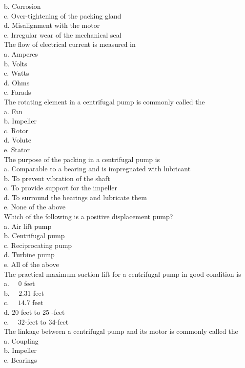 b. Corrosion\\
c. Over-tightening of the packing gland\\
d. Misalignment with the motor\\
e. Irregular wear of the mechanical seal\\
The flow of electrical current is measured in\\
a. Amperes\\
b. Volts\\
c. Watts\\
d. Ohms\\
e. Farads\\
  The rotating element in a centrifugal pump is commonly called the\\
a. Fan\\
b. Impeller\\
c. Rotor\\
d. Volute\\
e. Stator\\
The purpose of the packing in a centrifugal pump is\\
a. Comparable to a bearing and is impregnated with lubricant\\
b. To prevent vibration of the shaft\\
c. To provide support for the impeller\\
d. To surround the bearings and lubricate them\\
e. None of the above\\
  Which of the following is a positive displacement pump?\\
a. Air lift pump\\
b. Centrifugal pump\\
c. Reciprocating pump\\
d. Turbine pump\\
e. All of the above\\
The practical maximum suction lift for a centrifugal pump in good condition is \\
a. $\quad 0$ feet\\
b. $\quad 2.31$ feet\\
c. $\quad 14.7$ feet\\
d. 20 feet to 25 -feet\\
e. $\quad 32$-feet to 34-feet\\
 The linkage between a centrifugal pump and its motor is commonly called the\\
a. Coupling\\
b. Impeller\\
c. Bearings\\
